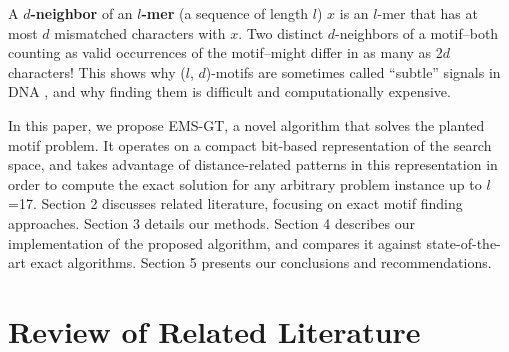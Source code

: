 \documentclass{acm_proc_article-sp}
\begin{document}
	\noindent

	A {\boldmath \textbf{$d$-neighbor} of an \textbf{$l$-mer}} (a sequence of length $l$) $x$ is an $l$-mer that has at most $d$ mismatched characters with $x$.  Two distinct $d$-neighbors of a motif--both counting as valid occurrences of the motif--might differ in as many as 2$d$ characters! This shows why ($l$, $d$)-motifs are sometimes called ``subtle'' signals in DNA  \cite{pevzner2000combinatorial}, and why finding them is difficult and computationally expensive.

	In this paper, we propose EMS-GT, a novel algorithm that solves the planted motif problem. It operates on a compact bit-based representation of the search space, and takes advantage of distance-related patterns in this representation in order to compute the exact solution for any arbitrary problem instance up to $l$=17. Section 2 discusses related literature, focusing on exact motif finding approaches. Section 3 details our methods. Section 4 describes our implementation of the proposed algorithm, and compares it against state-of-the-art exact algorithms. Section 5 presents our conclusions and recommendations.

\section{Review of Related Literature}
\end{document}
